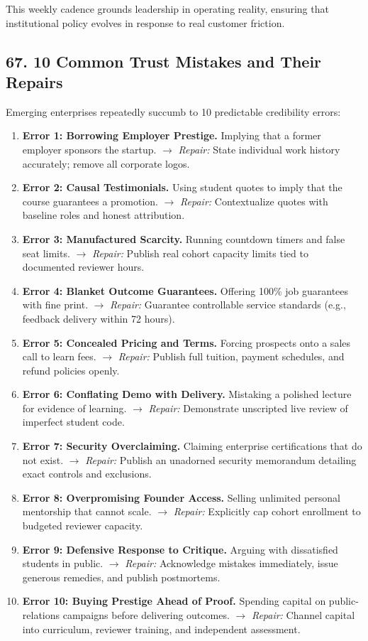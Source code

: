 This weekly cadence grounds leadership in operating reality, ensuring that institutional policy evolves in response to real customer friction.

\subsection*{67. 10 Common Trust Mistakes and Their Repairs}

Emerging enterprises repeatedly succumb to 10 predictable credibility errors:
\begin{enumerate}
\item \textbf{Error 1: Borrowing Employer Prestige.} Implying that a former employer sponsors the startup. $\rightarrow$ \emph{Repair:} State individual work history accurately; remove all corporate logos.
\item \textbf{Error 2: Causal Testimonials.} Using student quotes to imply that the course guarantees a promotion. $\rightarrow$ \emph{Repair:} Contextualize quotes with baseline roles and honest attribution.
\item \textbf{Error 3: Manufactured Scarcity.} Running countdown timers and false seat limits. $\rightarrow$ \emph{Repair:} Publish real cohort capacity limits tied to documented reviewer hours.
\item \textbf{Error 4: Blanket Outcome Guarantees.} Offering 100\% job guarantees with fine print. $\rightarrow$ \emph{Repair:} Guarantee controllable service standards (e.g., feedback delivery within 72 hours).
\item \textbf{Error 5: Concealed Pricing and Terms.} Forcing prospects onto a sales call to learn fees. $\rightarrow$ \emph{Repair:} Publish full tuition, payment schedules, and refund policies openly.
\item \textbf{Error 6: Conflating Demo with Delivery.} Mistaking a polished lecture for evidence of learning. $\rightarrow$ \emph{Repair:} Demonstrate unscripted live review of imperfect student code.
\item \textbf{Error 7: Security Overclaiming.} Claiming enterprise certifications that do not exist. $\rightarrow$ \emph{Repair:} Publish an unadorned security memorandum detailing exact controls and exclusions.
\item \textbf{Error 8: Overpromising Founder Access.} Selling unlimited personal mentorship that cannot scale. $\rightarrow$ \emph{Repair:} Explicitly cap cohort enrollment to budgeted reviewer capacity.
\item \textbf{Error 9: Defensive Response to Critique.} Arguing with dissatisfied students in public. $\rightarrow$ \emph{Repair:} Acknowledge mistakes immediately, issue generous remedies, and publish postmortems.
\item \textbf{Error 10: Buying Prestige Ahead of Proof.} Spending capital on public-relations campaigns before delivering outcomes. $\rightarrow$ \emph{Repair:} Channel capital into curriculum, reviewer training, and independent assessment.
\end{enumerate}

